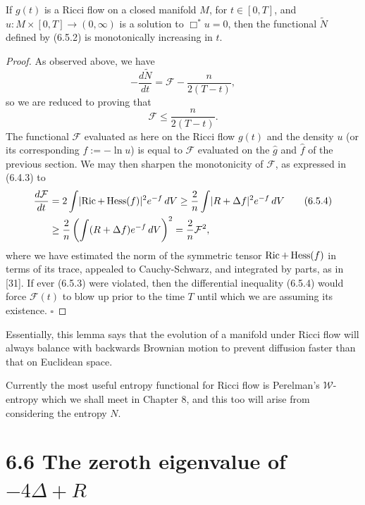 \begin{lemma}
\label{topping-gradient-flow-classical-entropy-monotone}
If $g(t)$ is a Ricci flow on a closed manifold $M$, for $t\in[0,T]$, and $u:M\times[0,T]\to(0,\infty)$ is a solution to $\Box^{*}u=0$, then the functional $\widetilde N$ defined by (6.5.2) is monotonically increasing in $t$.
\end{lemma}

\begin{proof}
As observed above, we have
\[
-\frac{d\widetilde N}{dt}=\mathcal F-\frac{n}{2(T-t)},
\]
so we are reduced to proving that
\begin{equation}\tag{6.5.3}
\mathcal F\le \frac{n}{2(T-t)}.
\end{equation}
The functional $\mathcal F$ evaluated as here on the Ricci flow $g(t)$ and the density $u$ (or its corresponding $f:=-\ln u$) is equal to $\mathcal F$ evaluated on the $\hat g$ and $\hat f$ of the previous section. We may then sharpen the monotonicity of $\mathcal F$, as expressed in (6.4.3) to
\begin{align}
\frac{d\mathcal F}{dt}
&=2\int \lvert \operatorname{Ric}+\operatorname{Hess}(f)\rvert^2 e^{-f}\,dV
\ge \frac{2}{n}\int \lvert R+\Delta f\rvert^2 e^{-f}\,dV \tag{6.5.4}\\
&\ge \frac{2}{n}\left(\int (R+\Delta f)e^{-f}\,dV\right)^2
=\frac{2}{n}\mathcal F^2,
\end{align}
where we have estimated the norm of the symmetric tensor $\operatorname{Ric}+\operatorname{Hess}(f)$ in terms of its trace, appealed to Cauchy-Schwarz, and integrated by parts, as in [31]. If ever (6.5.3) were violated, then the differential inequality (6.5.4) would force $\mathcal F(t)$ to blow up prior to the time $T$ until which we are assuming its existence.
\hfill$\square$
\end{proof}

Essentially, this lemma says that the evolution of a manifold under Ricci flow will always balance with backwards Brownian motion to prevent diffusion faster than that on Euclidean space.

Currently the most useful entropy functional for Ricci flow is Perelman's $\mathcal W$-entropy which we shall meet in Chapter 8, and this too will arise from considering the entropy $N$.

\section{6.6 \quad The zeroth eigenvalue of \texorpdfstring{$-4\Delta + R$}{-4 Delta + R}}

